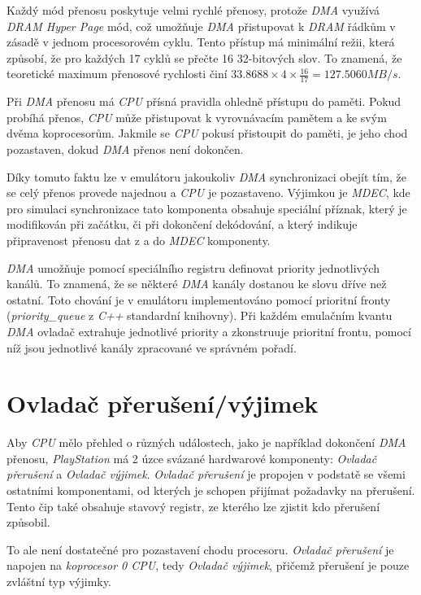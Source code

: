 Každý mód přenosu poskytuje velmi rychlé přenosy, protože \textit{DMA} využívá \textit{DRAM Hyper Page} mód, 
což umožňuje \textit{DMA} přistupovat k \textit{DRAM} řádkům v zásadě v jednom procesorovém cyklu. 
Tento přístup má minimální režii, která způsobí, že pro každých 17 cyklů se přečte 16 32-bitových slov. To znamená, že teoretické maximum přenosové rychlosti činí ${33.8688}\times4\times\frac{16}{17} = 127.5060 MB/s$.

Při \textit{DMA} přenosu má \textit{CPU} přísná pravidla ohledně přístupu do paměti. 
Pokud probíhá přenos, \textit{CPU} může přistupovat k vyrovnávacím pamětem a ke svým dvěma koprocesorům. 
Jakmile se \textit{CPU} pokusí přistoupit do paměti, je jeho chod pozastaven, dokud \textit{DMA} přenos není dokončen.

Díky tomuto faktu lze v emulátoru jakoukoliv \textit{DMA} synchronizaci obejít tím, že se celý přenos provede najednou a \textit{CPU} je pozastaveno. 
Výjimkou je \textit{MDEC}, kde pro simulaci synchronizace tato komponenta obsahuje speciální příznak, který je modifikován při začátku, či při dokončení dekódování,
a který indikuje připravenost přenosu dat z a do \textit{MDEC} komponenty.

\textit{DMA} umožňuje pomocí speciálního registru definovat priority jednotlivých kanálů.
To znamená, že se některé \textit{DMA} kanály dostanou ke slovu dříve než ostatní. Toto chování
je v emulátoru implementováno pomocí prioritní fronty (\textit{priority\_queue} z \textit{C++} standardní knihovny). 
Při každém emulačním kvantu \textit{DMA} ovladač extrahuje jednotlivé priority a zkonstruuje
prioritní frontu, pomocí níž jsou jednotlivé kanály zpracované ve správném pořadí. 


\section{Ovladač přerušení/výjimek}

Aby \textit{CPU} mělo přehled o různých událostech, jako je například dokončení \textit{DMA} přenosu, 
\textit{PlayStation} má 2 úzce svázané hardwarové komponenty: \textit{Ovladač přerušení} a \textit{Ovladač výjimek}. 
\textit{Ovladač přerušení} je propojen v podstatě se všemi ostatními komponentami, od kterých je schopen přijímat požadavky na přerušení. 
Tento čip také obsahuje stavový registr, ze kterého lze zjistit kdo přerušení způsobil.

To ale není dostatečné pro pozastavení chodu procesoru. 
\textit{Ovladač přerušení} je napojen na \textit{koprocesor 0 CPU}, tedy \textit{Ovladač výjimek}, 
přičemž přerušení je pouze zvláštní typ výjimky.

